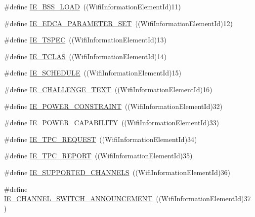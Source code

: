 \begin{DoxyCompactItemize}
\item 
\#define \hyperlink{wifi-information-element_8h_a7b437af63002089ba72416ce38d6e0b1}{I\+E\+\_\+\+B\+S\+S\+\_\+\+L\+O\+AD}~((Wifi\+Information\+Element\+Id)11)
\item 
\#define \hyperlink{wifi-information-element_8h_a702375d02b434d98f24c7588952c4a55}{I\+E\+\_\+\+E\+D\+C\+A\+\_\+\+P\+A\+R\+A\+M\+E\+T\+E\+R\+\_\+\+S\+ET}~((Wifi\+Information\+Element\+Id)12)
\item 
\#define \hyperlink{wifi-information-element_8h_a8ef0c6e494c31841a86e711e7fd48e18}{I\+E\+\_\+\+T\+S\+P\+EC}~((Wifi\+Information\+Element\+Id)13)
\item 
\#define \hyperlink{wifi-information-element_8h_a10c62cc5d50f55b699eee3c69ea7eab5}{I\+E\+\_\+\+T\+C\+L\+AS}~((Wifi\+Information\+Element\+Id)14)
\item 
\#define \hyperlink{wifi-information-element_8h_a078440ff09963a3417818302ee55e8b8}{I\+E\+\_\+\+S\+C\+H\+E\+D\+U\+LE}~((Wifi\+Information\+Element\+Id)15)
\item 
\#define \hyperlink{wifi-information-element_8h_ac3fcc05d239e83a7c620369138e63f5f}{I\+E\+\_\+\+C\+H\+A\+L\+L\+E\+N\+G\+E\+\_\+\+T\+E\+XT}~((Wifi\+Information\+Element\+Id)16)
\item 
\#define \hyperlink{wifi-information-element_8h_aaaa339188a03463dac9fe12d6a7d0d72}{I\+E\+\_\+\+P\+O\+W\+E\+R\+\_\+\+C\+O\+N\+S\+T\+R\+A\+I\+NT}~((Wifi\+Information\+Element\+Id)32)
\item 
\#define \hyperlink{wifi-information-element_8h_a219e58d02cce1d0c9b375248dc93ccc6}{I\+E\+\_\+\+P\+O\+W\+E\+R\+\_\+\+C\+A\+P\+A\+B\+I\+L\+I\+TY}~((Wifi\+Information\+Element\+Id)33)
\item 
\#define \hyperlink{wifi-information-element_8h_a72bb09cabe8812e29d20db4e5ae42c12}{I\+E\+\_\+\+T\+P\+C\+\_\+\+R\+E\+Q\+U\+E\+ST}~((Wifi\+Information\+Element\+Id)34)
\item 
\#define \hyperlink{wifi-information-element_8h_a9dd94d9e5677b0ae2cc0bc049434bf89}{I\+E\+\_\+\+T\+P\+C\+\_\+\+R\+E\+P\+O\+RT}~((Wifi\+Information\+Element\+Id)35)
\item 
\#define \hyperlink{wifi-information-element_8h_a3fd757ff70cfca61206db864afe2f097}{I\+E\+\_\+\+S\+U\+P\+P\+O\+R\+T\+E\+D\+\_\+\+C\+H\+A\+N\+N\+E\+LS}~((Wifi\+Information\+Element\+Id)36)
\item 
\#define \hyperlink{wifi-information-element_8h_ad1600008f8c18c7317f515d31de497ff}{I\+E\+\_\+\+C\+H\+A\+N\+N\+E\+L\+\_\+\+S\+W\+I\+T\+C\+H\+\_\+\+A\+N\+N\+O\+U\+N\+C\+E\+M\+E\+NT}~((Wifi\+Information\+Element\+Id)37)

\end{DoxyCompactItemize}
